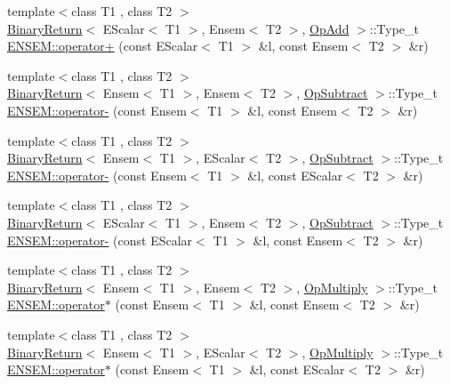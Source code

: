 \begin{DoxyCompactItemize}
\item 
{\footnotesize template$<$class T1 , class T2 $>$ }\\\mbox{\hyperlink{structBinaryReturn}{Binary\+Return}}$<$ E\+Scalar$<$ T1 $>$, Ensem$<$ T2 $>$, \mbox{\hyperlink{structOpAdd}{Op\+Add}} $>$\+::Type\+\_\+t \mbox{\hyperlink{group__eensem_ga28163898a2dffc17215669f8a85d65b4}{E\+N\+S\+E\+M\+::operator+}} (const E\+Scalar$<$ T1 $>$ \&l, const Ensem$<$ T2 $>$ \&r)
\item 
{\footnotesize template$<$class T1 , class T2 $>$ }\\\mbox{\hyperlink{structBinaryReturn}{Binary\+Return}}$<$ Ensem$<$ T1 $>$, Ensem$<$ T2 $>$, \mbox{\hyperlink{structOpSubtract}{Op\+Subtract}} $>$\+::Type\+\_\+t \mbox{\hyperlink{group__eensem_gaa7400c6ebea61c6e2869c81ab28d68b0}{E\+N\+S\+E\+M\+::operator-\/}} (const Ensem$<$ T1 $>$ \&l, const Ensem$<$ T2 $>$ \&r)
\item 
{\footnotesize template$<$class T1 , class T2 $>$ }\\\mbox{\hyperlink{structBinaryReturn}{Binary\+Return}}$<$ Ensem$<$ T1 $>$, E\+Scalar$<$ T2 $>$, \mbox{\hyperlink{structOpSubtract}{Op\+Subtract}} $>$\+::Type\+\_\+t \mbox{\hyperlink{group__eensem_ga2ca6914217df099912f3f38239141a55}{E\+N\+S\+E\+M\+::operator-\/}} (const Ensem$<$ T1 $>$ \&l, const E\+Scalar$<$ T2 $>$ \&r)
\item 
{\footnotesize template$<$class T1 , class T2 $>$ }\\\mbox{\hyperlink{structBinaryReturn}{Binary\+Return}}$<$ E\+Scalar$<$ T1 $>$, Ensem$<$ T2 $>$, \mbox{\hyperlink{structOpSubtract}{Op\+Subtract}} $>$\+::Type\+\_\+t \mbox{\hyperlink{group__eensem_ga800941462d54db3919bdb1fe8cd1c1b6}{E\+N\+S\+E\+M\+::operator-\/}} (const E\+Scalar$<$ T1 $>$ \&l, const Ensem$<$ T2 $>$ \&r)
\item 
{\footnotesize template$<$class T1 , class T2 $>$ }\\\mbox{\hyperlink{structBinaryReturn}{Binary\+Return}}$<$ Ensem$<$ T1 $>$, Ensem$<$ T2 $>$, \mbox{\hyperlink{structOpMultiply}{Op\+Multiply}} $>$\+::Type\+\_\+t \mbox{\hyperlink{group__eensem_gacf3333408054c89c251c9c44d25fa321}{E\+N\+S\+E\+M\+::operator$\ast$}} (const Ensem$<$ T1 $>$ \&l, const Ensem$<$ T2 $>$ \&r)
\item 
{\footnotesize template$<$class T1 , class T2 $>$ }\\\mbox{\hyperlink{structBinaryReturn}{Binary\+Return}}$<$ Ensem$<$ T1 $>$, E\+Scalar$<$ T2 $>$, \mbox{\hyperlink{structOpMultiply}{Op\+Multiply}} $>$\+::Type\+\_\+t \mbox{\hyperlink{group__eensem_gad8e9dadde3e0114542b222f4631cc216}{E\+N\+S\+E\+M\+::operator$\ast$}} (const Ensem$<$ T1 $>$ \&l, const E\+Scalar$<$ T2 $>$ \&r)

\end{DoxyCompactItemize}
